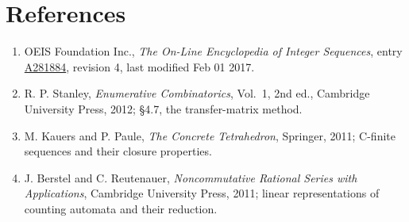 \documentclass[11pt]{article}
\theoremstyle{definition}
\begin{document}
\section{References}

\begin{enumerate}

\item OEIS Foundation Inc., \emph{The On-Line Encyclopedia of Integer Sequences}, entry \href{https://oeis.org/A281884}{A281884}, revision 4, last modified Feb 01 2017.

\item R. P. Stanley, \emph{Enumerative Combinatorics}, Vol.~1, 2nd ed., Cambridge University Press, 2012; \S4.7, the transfer-matrix method.

\item M. Kauers and P. Paule, \emph{The Concrete Tetrahedron}, Springer, 2011; C-finite sequences and their closure properties.

\item J. Berstel and C. Reutenauer, \emph{Noncommutative Rational Series with Applications}, Cambridge University Press, 2011; linear representations of counting automata and their reduction.

\end{enumerate}
\end{document}

